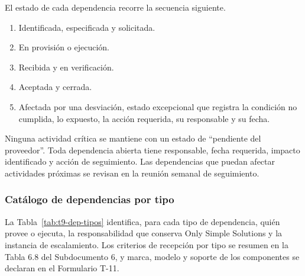 \documentclass[11pt]{article}
\providecommand{\tightlist}{%
  \setlength{\itemsep}{0pt}\setlength{\parskip}{0pt}}
\begin{document}
El estado de cada dependencia recorre la secuencia siguiente.

\begin{enumerate}
\tightlist
\item
  Identificada, especificada y solicitada.
\item
  En provisión o ejecución.
\item
  Recibida y en verificación.
\item
  Aceptada y cerrada.
\item
  Afectada por una desviación, estado excepcional que registra la condición no cumplida, lo expuesto, la acción requerida, su responsable y su fecha.
\end{enumerate}

Ninguna actividad crítica se mantiene con un estado de “pendiente del proveedor”. Toda dependencia abierta tiene responsable, fecha requerida, impacto identificado y acción de seguimiento. Las dependencias que puedan afectar actividades próximas se revisan en la reunión semanal de seguimiento.

\subsubsection{Catálogo de dependencias por tipo}\label{t9-6-tipos}

La Tabla~\mbox{\ref{tab:t9-dep-tipos}} identifica, para cada tipo de dependencia, quién provee o ejecuta, la responsabilidad que conserva Only Simple Solutions y la instancia de escalamiento. Los criterios de recepción por tipo se resumen en la Tabla 6.8 del Subdocumento 6, y marca, modelo y soporte de los componentes se declaran en el Formulario T-11.
\end{document}

